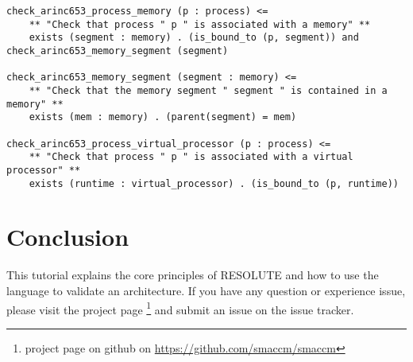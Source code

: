\documentclass[times, 10pt]{article}
\begin{document}
\begin{lstlisting}
check_arinc653_process_memory (p : process) <=
	** "Check that process " p " is associated with a memory" **
	exists (segment : memory) . (is_bound_to (p, segment)) and check_arinc653_memory_segment (segment)

check_arinc653_memory_segment (segment : memory) <=
	** "Check that the memory segment " segment " is contained in a memory" **
	exists (mem : memory) . (parent(segment) = mem)

check_arinc653_process_virtual_processor (p : process) <=
	** "Check that process " p " is associated with a virtual processor" **
	exists (runtime : virtual_processor) . (is_bound_to (p, runtime))		
\end{lstlisting}


\section{Conclusion}
This tutorial explains the core principles of RESOLUTE and how to use
the language to validate an architecture. If you have any question
or experience issue, please visit the project page 
\footnote{project page on github on \url{https://github.com/smaccm/smaccm}}
and submit an issue on the issue tracker.
\end{document}
